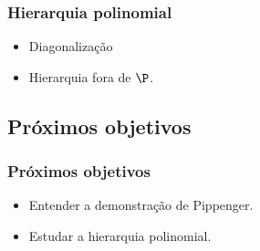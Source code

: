 \documentclass[utf8,notheorems]{beamer}
\theoremstyle{definition}
\begin{document}
\begin{frame}
    \frametitle{Hierarquia polinomial}

    \begin{itemize}
        \item Diagonalização
        \item Hierarquia fora de $\P$.
    \end{itemize}
\end{frame}

\subsection{Próximos objetivos}
\begin{frame}
    \frametitle{Próximos objetivos}

    \begin{itemize}
        \item Entender a demonstração de Pippenger.
        \item Estudar a hierarquia polinomial.
    \end{itemize}
\end{frame}
\end{document}

